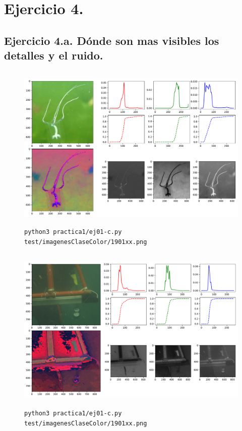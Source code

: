 \documentclass[11pt, spanish]{article}
\begin{document}
\newpage

\section{Ejercicio 4.}

\subsection{Ejercicio 4.a. Dónde son mas visibles los detalles y el ruido.}
\begin{figure}[H]
\centering
  \includegraphics[height=8cm]{informe-imgs/ej04-1.pdf}
  \caption{\texttt{python3 practica1/ej01-c.py test/imagenesClaseColor/1901xx.png}}
\end{figure}
\begin{figure}[H]
\centering
  \includegraphics[height=8cm]{informe-imgs/ej04-2.pdf}
  \caption{\texttt{python3 practica1/ej01-c.py test/imagenesClaseColor/1901xx.png}}
\end{figure}
\end{document}
